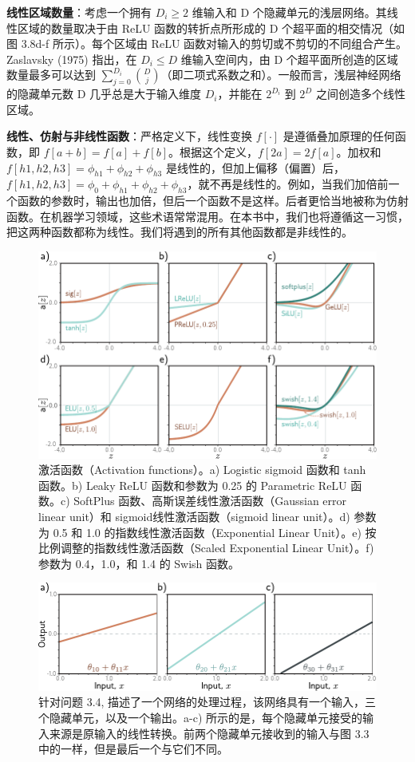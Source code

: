 \documentclass[lang=cn,newtx,10pt,scheme=chinese]{elegantbook}
\begin{document}
\textbf{线性区域数量}：考虑一个拥有 \(D_i \geq 2\) 维输入和 D 个隐藏单元的浅层网络。其线性区域的数量取决于由 ReLU 函数的转折点所形成的 D 个超平面的相交情况（如图 3.8d-f 所示）。每个区域由 ReLU 函数对输入的剪切或不剪切的不同组合产生。Zaslavsky (1975) 指出，在 \(D_i \leq D\) 维输入空间内，由 D 个超平面所创造的区域数量最多可以达到 \(\sum_{j=0}^{D_i} \binom{D}{j}\)（即二项式系数之和）。一般而言，浅层神经网络的隐藏单元数 D 几乎总是大于输入维度 \(D_i\)，并能在 \(2^{D_i}\) 到 \(2^D\) 之间创造多个线性区域。

\textbf{线性、仿射与非线性函数}：严格定义下，线性变换 \(f[\cdot]\) 是遵循叠加原理的任何函数，即  \(f[a + b] = f[a] + f[b]\)。根据这个定义，\(f[2a] = 2f[a]\)。加权和 \(f[h1, h2, h3] = \phi_{h1} + \phi_{h2} + \phi_{h3}\) 是线性的，但加上偏移（偏置）后，\(f[h1, h2, h3] = \phi_0 + \phi_{h1} + \phi_{h2} + \phi_{h3}\)，就不再是线性的。例如，当我们加倍前一个函数的参数时，输出也加倍，但后一个函数不是这样。后者更恰当地被称为仿射函数。在机器学习领域，这些术语常常混用。在本书中，我们也将遵循这一习惯，把这两种函数都称为线性。我们将遇到的所有其他函数都是非线性的。


\begin{figure}[ht!]
	\centering
	\includegraphics[width=0.7\linewidth]{PDFFigures/UDLChap3PDF/ShallowActivations.pdf}
\caption{激活函数（Activation functions）。a) Logistic sigmoid 函数和 tanh 函数。b) Leaky ReLU 函数和参数为 0.25 的 Parametric ReLU 函数。c) SoftPlus 函数、高斯误差线性激活函数（Gaussian error linear unit）和 sigmoid线性激活函数（sigmoid linear unit）。d) 参数为 0.5 和 1.0 的指数线性激活函数（Exponential Linear Unit）。e) 按比例调整的指数线性激活函数（Scaled Exponential Linear Unit）。f) 参数为 0.4，1.0，和 1.4 的 Swish 函数。}
\end{figure}

\begin{figure}[ht!]
	\centering
	\includegraphics[width=0.7\linewidth]{PDFFigures/UDLChap3PDF/ShallowChangeSlope.pdf}
\caption{针对问题 3.4, 描述了一个网络的处理过程，该网络具有一个输入，三个隐藏单元，以及一个输出。a-c) 所示的是，每个隐藏单元接受的输入来源是原输入的线性转换。前两个隐藏单元接收到的输入与图 3.3 中的一样，但是最后一个与它们不同。}
\end{figure}
\end{document}
